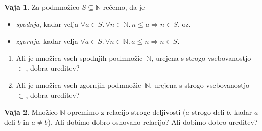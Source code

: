 \documentclass{article}
\newcommand{\all}[1]{\forall #1 .\,}
\newcommand{\lthen}{\Rightarrow}
\newcommand{\NN}{\mathbb{N}}
\theoremstyle{definition}
\newtheorem{vaja}{Vaja}
\begin{document}
\begin{vaja}
  Za podmnožico $S \subseteq \NN$ rečemo, da je
  \begin{itemize}
    \item
      \emph{spodnja}, kadar velja $\all{a \in S}\all{n \in \NN}{n \leq a \lthen n \in S}$, oz.
    \item
      \emph{zgornja}, kadar velja $\all{a \in S}\all{n \in \NN}{a \leq n \lthen n \in S}$.
  \end{itemize}
  \begin{enumerate}
    \item
      Ali je množica vseh spodnjih podmnožic~$\NN$, urejena s strogo vsebovanostjo~$\subset$, dobra ureditev?
    \item
      Ali je množica vseh zgornjih podmnožic~$\NN$, urejena s strogo vsebovanostjo~$\subset$, dobra ureditev?
  \end{enumerate}
\end{vaja}

\begin{vaja}
  Množico $\NN$ opremimo z relacijo stroge deljivosti ($a$ strogo deli $b$, kadar $a$ deli $b$ in $a \neq b$). Ali dobimo dobro osnovano relacijo? Ali dobimo dobro ureditev?
\end{vaja}
\end{document}
